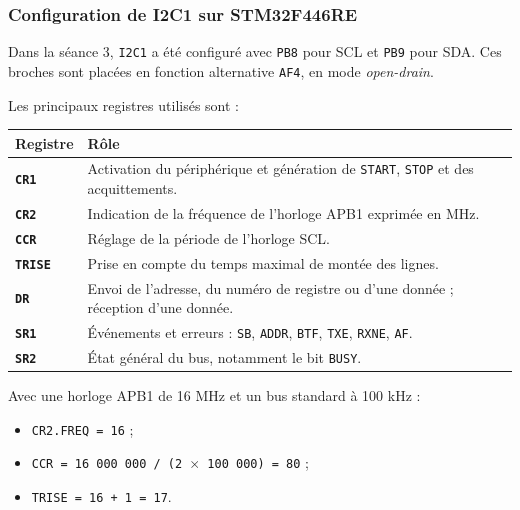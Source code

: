 \documentclass[11pt,a4paper]{article}
\begin{document}
	\begin{center}
	\end{center}
	
	\subsubsection*{Configuration de I2C1 sur STM32F446RE}
	
	Dans la séance 3, \texttt{I2C1} a été configuré avec \texttt{PB8} pour SCL et \texttt{PB9} pour SDA. Ces broches sont placées en fonction alternative \texttt{AF4}, en mode \textit{open-drain}.
	
	Les principaux registres utilisés sont :
	
	\begin{center}
		\begin{tabular}{>{\bfseries}p{3.5cm}p{9.5cm}}
			\toprule
			Registre & Rôle \\
			\midrule
			\texttt{CR1} & Activation du périphérique et génération de \texttt{START}, \texttt{STOP} et des acquittements. \\
			\texttt{CR2} & Indication de la fréquence de l'horloge APB1 exprimée en MHz. \\
			\texttt{CCR} & Réglage de la période de l'horloge SCL. \\
			\texttt{TRISE} & Prise en compte du temps maximal de montée des lignes. \\
			\texttt{DR} & Envoi de l'adresse, du numéro de registre ou d'une donnée ; réception d'une donnée. \\
			\texttt{SR1} & Événements et erreurs : \texttt{SB}, \texttt{ADDR}, \texttt{BTF}, \texttt{TXE}, \texttt{RXNE}, \texttt{AF}. \\
			\texttt{SR2} & État général du bus, notamment le bit \texttt{BUSY}. \\
			\bottomrule
		\end{tabular}
	\end{center}
	
	Avec une horloge APB1 de 16 MHz et un bus standard à 100 kHz :
	
	\begin{itemize}
		\item \texttt{CR2.FREQ = 16} ;
		\item \texttt{CCR = 16 000 000 / (2 $\times$ 100 000) = 80} ;
		\item \texttt{TRISE = 16 + 1 = 17}.
	\end{itemize}
	
\end{document}

